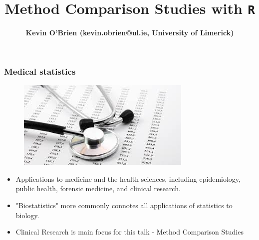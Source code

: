 \documentclass[compress]{beamer}        %
\title
	{
		{\huge Method Comparison Studies with \texttt{R}\\[0.3cm] }
	}
\author[Kevin O'Brien]{{\bf Kevin O'Brien (kevin.obrien@ul.ie, University of Limerick)}}
\institute[University of Limerick, Maths \& Stats Dept]{}
\date{}
\begin{document}
		
		\begin{frame}
			\vspace{-0.4cm}
			\titlepage
			
		\end{frame}
		
		
		\begin{frame}
			\frametitle{Medical statistics }
			\large
			\begin{figure}
				\centering
				\includegraphics[width=0.4\linewidth]{images/medstats}
			\end{figure}
			
			\begin{itemize}
				\item Applications to medicine and the health sciences, including epidemiology, public health, forensic medicine, and clinical research. 
				\item "Biostatistics" more commonly connotes all applications of statistics to biology.
				\item Clinical Research is main focus for this talk - Method Comparison Studies
			\end{itemize}
		\end{frame}	
		
%				
%				
%				
%		
		
\end{document}
